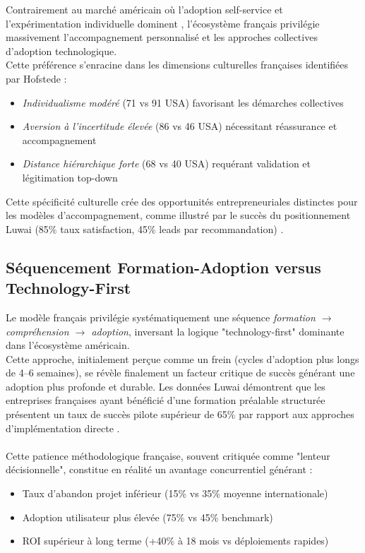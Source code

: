 Contrairement au marché américain où l'adoption self-service et l'expérimentation individuelle dominent \cite{mit2024ai_adoption}, l'écosystème français privilégie massivement l'accompagnement personnalisé et les approches collectives d'adoption technologique.\\
Cette préférence s'enracine dans les dimensions culturelles françaises identifiées par Hofstede :
\begin{itemize}
    \item \emph{Individualisme modéré} (71 vs 91 USA) favorisant les démarches collectives
    \item \emph{Aversion à l'incertitude élevée} (86 vs 46 USA) nécessitant réassurance et accompagnement
    \item \emph{Distance hiérarchique forte} (68 vs 40 USA) requérant validation et légitimation top-down
\end{itemize}
\medskip
Cette spécificité culturelle crée des opportunités entrepreneuriales distinctes pour les modèles d'accompagnement, comme illustré par le succès du positionnement Luwai (85\% taux satisfaction, 45\% leads par recommandation) \cite{hofstede2001culture}.

\subsection{Séquencement Formation-Adoption versus Technology-First}

Le modèle français privilégie systématiquement une séquence \emph{formation $\rightarrow$ compréhension $\rightarrow$ adoption}, inversant la logique "technology-first" dominante dans l'écosystème américain.\\
Cette approche, initialement perçue comme un frein (cycles d'adoption plus longs de 4--6 semaines), se révèle finalement un facteur critique de succès générant une adoption plus profonde et durable. Les données Luwai démontrent que les entreprises françaises ayant bénéficié d'une formation préalable structurée présentent un taux de succès pilote supérieur de 65\% par rapport aux approches d'implémentation directe \cite{luwai2025meetings}.
\\\\
Cette patience méthodologique française, souvent critiquée comme "lenteur décisionnelle", constitue en réalité un avantage concurrentiel générant :
\begin{itemize}
    \item Taux d'abandon projet inférieur (15\% vs 35\% moyenne internationale)
    \item Adoption utilisateur plus élevée (75\% vs 45\% benchmark)
    \item ROI supérieur à long terme (+40\% à 18 mois vs déploiements rapides)
\end{itemize}

